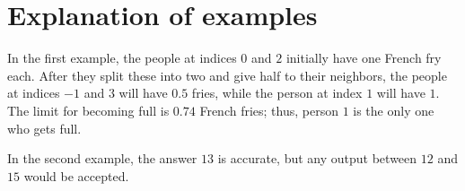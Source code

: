 \section*{Explanation of examples}
In the first example, the people at indices $0$ and $2$ initially have one French fry each.
After they split these into two and give half to their neighbors, the people at indices $-1$ and $3$ will have
$0.5$ fries, while the person at index $1$ will have $1$. The limit for becoming full is $0.74$ French fries;
thus, person $1$ is the only one who gets full.

In the second example, the answer $13$ is accurate, but any output between $12$ and $15$ would be accepted.
